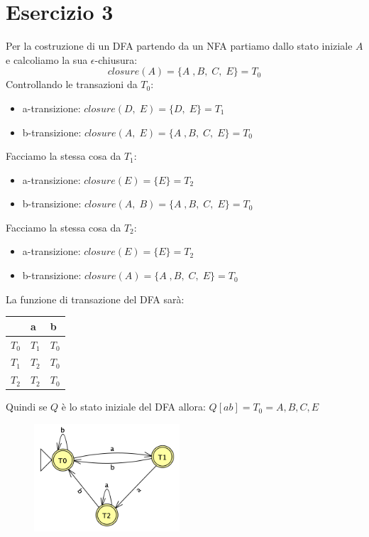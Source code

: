 \documentclass[11pt]{article}
\begin{document}
\section*{Esercizio 3}
Per la costruzione di un DFA partendo da un NFA partiamo dallo
stato iniziale $A$ e calcoliamo la sua $\epsilon$-chiusura:
$$closure(A) = \{A\;,B,\;C,\;E\} = T_0$$
Controllando le transazioni da $T_0$:
\begin{itemize}
  \item a-transizione: $closure(D,\;E) = \{D,\;E\} = T_1$
  \item b-transizione: $closure(A,\;E) = \{A\;,B,\;C,\;E\} = T_0$
\end{itemize}
Facciamo la stessa cosa da $T_1$:
\begin{itemize}
  \item a-transizione: $closure(E) = \{E\} = T_2$
  \item b-transizione: $closure(A,\;B) = \{A\;,B,\;C,\;E\} = T_0$
\end{itemize}
Facciamo la stessa cosa da $T_2$:
\begin{itemize}
  \item a-transizione: $closure(E) = \{E\} = T_2$
  \item b-transizione: $closure(A) = \{A\;,B,\;C,\;E\} = T_0$
\end{itemize}
La funzione di transazione del DFA sarà:
\begin{table}[H]
  \centering
  \begin{tabularx}{\textwidth}{|>{\centering\arraybackslash}X|>{\centering\arraybackslash}X|>{\centering\arraybackslash}X|}
  \hline
  & \textbf{a} & \textbf{b}  \\
  \hline
  $T_0$ & $T_1$ & $T_0$\\
  \hline
  $T_1$ & $T_2$ & $T_0$ \\
  \hline
  $T_2$ & $T_2$ & $T_0$ \\
  \hline
  \end{tabularx}
  \label{tab:03-parsing-table}
\end{table}
Quindi se $Q$ è lo stato iniziale del DFA allora: $Q[ab] = T_0 = {A, B, C, E}$
\begin{figure}[H]
  \centering
  \includegraphics[height=4cm]{img/03DFA.png}
  \label{fig:03-DFA}
\end{figure} 
\end{document}
